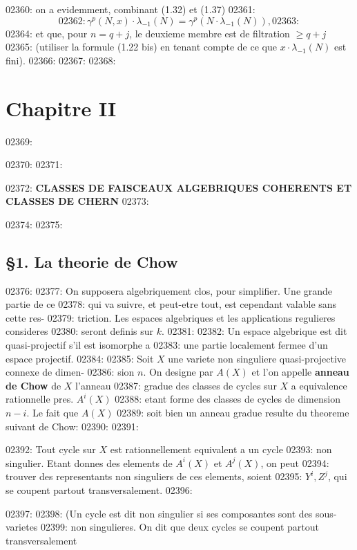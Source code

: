 02360: on a evidemment, combinant (1.32) et (1.37)
02361: \begin{equation}
02362: \gamma^p(N, x) \cdot \lambda_{-1}(N) = \gamma^p(N \cdot \lambda_{-1}(N)),
02363: \end{equation}
02364: et que, pour $n = q + j$, le deuxieme membre est de filtration $\geq q + j$
02365: (utiliser la formule (1.22 bis) en tenant compte de ce que $x \cdot \lambda_{-1}(N)$ est fini).
02366: 
02367: 
02368: \section*{Chapitre II}
02369: 
02370: 
02371: \begin{center}
02372: \Large\textbf{CLASSES DE FAISCEAUX ALGEBRIQUES COHERENTS ET CLASSES DE CHERN}
02373: \end{center}
02374: 
02375: \subsection*{\S 1. La theorie de Chow}
02376: 
02377: On supposera algebriquement clos, pour simplifier. Une grande partie de ce
02378: qui va suivre, et peut-etre tout, est cependant valable sans cette res-
02379: triction. Les espaces algebriques et les applications regulieres consideres
02380: seront definis sur $k$.
02381: 
02382: Un espace algebrique est dit quasi-projectif s'il est isomorphe a
02383: une partie localement fermee d'un espace projectif.
02384: 
02385: Soit $X$ une variete non singuliere quasi-projective connexe de dimen-
02386: sion $n$. On designe par $A(X)$ et l'on appelle \textbf{anneau de Chow} de $X$ l'anneau
02387: gradue des classes de cycles sur $X$ a equivalence rationnelle pres. $A^i(X)$
02388: etant forme des classes de cycles de dimension $n - i$. Le fait que $A(X)$
02389: soit bien un anneau gradue resulte du theoreme suivant de Chow:
02390: 
02391: \begin{theorem}[Chow]
02392: Tout cycle sur $X$ est rationnellement equivalent a un cycle
02393: non singulier. Etant donnes des elements de $A^i(X)$ et $A^j(X)$, on peut
02394: trouver des representants non singuliers de ces elements, soient
02395: $Y^i, Z^j$, qui se coupent partout transversalement.
02396: \end{theorem}
02397: 
02398: (Un cycle est dit non singulier si ses composantes sont des sous-varietes
02399: non singulieres. On dit que deux cycles se coupent partout transversalement
